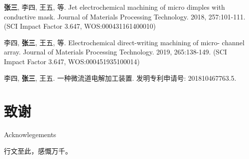 \documentclass[
  type=doctor
]{../gdutthesis}
\begin{document}

\begin{results}
  \item \textbf{张三}, 李四, 王五, 等. Jet electrochemical machining of micro dimples with conductive mask.
  Journal of Materials Processing Technology. 2018, 257:101-111. (SCI Impact Factor 3.647,
  WOS:000431161400010)
  \item 李四, \textbf{张三}, 王五, 等. Electrochemical direct-writing machining of micro- channel array.
  Journal of Materials Processing Technology. 2019, 265:138-149. (SCI Impact Factor 3.647,
  WOS:000451935100014)
\end{results}


\begin{results}
  \item 李四, \textbf{张三}, 王五. 一种微流道电解加工装置. 发明专利申请号: 201810467763.5.
\end{results}

\gdutstatement

\chapter{致谢}{Acknowlegements}

行文至此，感慨万千。
\end{document}
